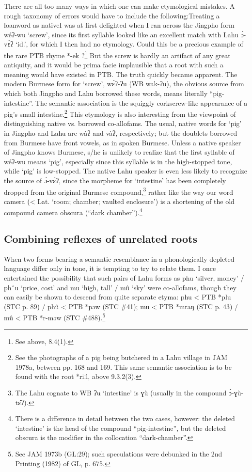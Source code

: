 There are all too many ways in which one can make etymological mistakes. A rough taxonomy of errors would have to include the following:Treating a loanword as nativeI was at first delighted when I ran across the Jingpho form wéʔ-wu `screw', since its first syllable looked like an excellent match with Lahu ɔ̀-vɛ̀ʔ `id.', for which I then had no etymology. Could this be a precious example of the rare PTB rhyme *-ek ?\footnote{See above, 8.4(1).}
But the screw is hardly an artifact of any great antiquity, and it would be prima facie implausible that a root with such a meaning would have existed in PTB. The truth quickly became apparent. The modern Burmese form for `screw', wɛ́ʔ-ʔu (WB wak-ʔu), the obvious source from which both Jingpho and Lahu borrowed these words, means literally ``pig-intestine''. The semantic association is the squiggly corkscrew-like appearance of a pig's small intestine.\footnote{See the photographs of a pig being butchered in a Lahu village in JAM 1978a, between pp. 168 and 169. This same semantic association is to be found with the root *riːl, above 9.3.2(3).} This etymology is also interesting from the viewpoint of distinguishing native vs. borrowed co-allofams. The usual, native words for `pig' in Jingpho and Lahu are wàʔ and vàʔ, respectively; but the doublets borrowed from Burmese have front vowels, as in spoken Burmese. Unless a native speaker of Jingpho knows Burmese, s/he is unlikely to realize that the first syllable of wéʔ-wu means `pig', especially since this syllable is in the high-stopped tone, while `pig' is low-stopped. The native Lahu speaker is even less likely to recognize the source of ɔ̀-vɛ̀ʔ, since the morpheme for `intestine' has been completely dropped from the original Burmese compound,\footnote{The Lahu cognate to WB ʔu ‘intestine’ is ɣù (usually in the compound ɔ̀-ɣù-tɛ̂ʔ).} rather like the way our word camera (< Lat. `room; chamber; vaulted enclosure') is a shortening of the old compound camera obscura (``dark chamber'').\footnote{There is a difference in detail between the two cases, however: the deleted ‘intestine’ is the head of the compound “pig-intestine”, but the deleted obscura is the modifier in the collocation “dark-chamber”.}

\subsection{Combining reflexes of unrelated roots}
When two forms bearing a semantic resemblance in a phonologically depleted language differ only in tone, it is tempting to try to relate them. I once entertained the possibility that such pairs of Lahu forms as phu `silver, money' / phˆu `price, cost' and mu `high, tall' / mû `sky' were co-allofams, though they can easily be shown to descend from quite separate etyma: phu < PTB *plu (STC p. 89) / phû < PTB *pəw (STC \#41); mu < PTB *mraŋ (STC p. 43) / mû < PTB *r-məw (STC \#488).\footnote{See JAM 1973b (GL:29); such speculations were debunked in the 2nd Printing (1982) of GL, p. 675.}

